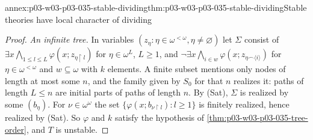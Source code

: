 \begin{annexitem}{annex:p03-w03-p03-035-stable-dividing}{thm:p03-w03-p03-035-stable-dividing}{Stable theories have local character of dividing}
\begin{proof}
\emph{An infinite tree.}  In variables \((z_\eta:\eta\in\omega^{<\omega},
\eta\neq\varnothing)\) let \(\Sigma\) consist of
\(\exists x\bigwedge_{1\leq l\leq L}\varphi(x;z_{\eta\restriction l})\) for
\(\eta\in\omega^L\), \(L\geq1\), and
\(\neg\exists x\bigwedge_{i\in w}\varphi(x;z_{\eta\frown\langle i\rangle})\) for
\(\eta\in\omega^{<\omega}\) and \(w\subseteq\omega\) with \(k\) elements.  A
finite subset mentions only nodes of length at most some \(n\), and the family
given by \(S_0\) for that \(n\) realizes it: paths of length \(L\leq n\) are
initial parts of paths of length \(n\).  By (Sat), \(\Sigma\) is realized by
some \((b_\eta)\).  For \(\nu\in\omega^\omega\) the set
\(\{\varphi(x;b_{\nu\restriction l}):l\geq1\}\) is finitely realized, hence
realized by (Sat).  So \(\varphi\) and \(k\) satisfy the hypothesis of
\cref{thm:p03-w03-p03-035-tree-order}, and \(T\) is unstable.
\end{proof}
\end{annexitem}

